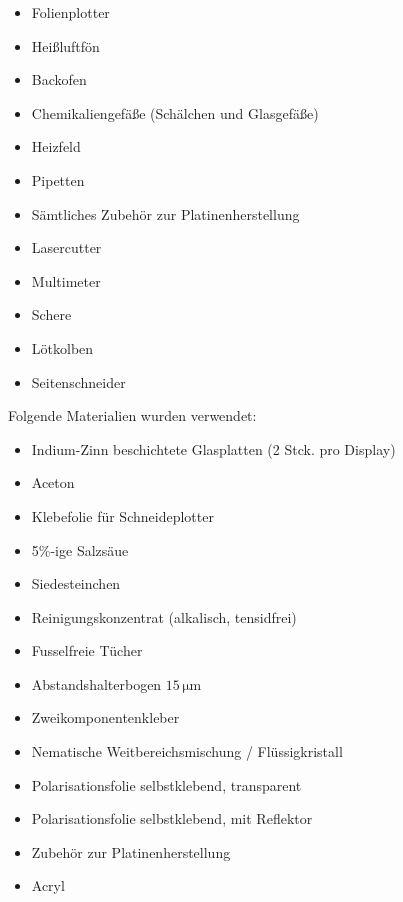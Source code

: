 \begin{itemize}
\item Folienplotter
\item Heißluftfön
\item Backofen
\item Chemikaliengefäße (Schälchen und Glasgefäße)
\item Heizfeld
\item Pipetten
\item Sämtliches Zubehör zur Platinenherstellung
\item Lasercutter
\item Multimeter
\item Schere
\item Lötkolben
\item Seitenschneider\\
\end{itemize}



Folgende Materialien wurden verwendet:\\

\begin{itemize}
\item Indium-Zinn beschichtete Glasplatten (2 Stck. pro Display)
\item Aceton
\item Klebefolie für Schneideplotter
\item 5\%-ige Salzsäue
\item Siedesteinchen
\item Reinigungskonzentrat (alkalisch, tensidfrei)
\item Fusselfreie Tücher
\item Abstandshalterbogen \(15\,\mathrm{\mu m}\)
\item Zweikomponentenkleber
\item Nematische Weitbereichsmischung / Flüssigkristall
\item Polarisationsfolie selbstklebend, transparent
\item Polarisationsfolie selbstklebend, mit Reflektor
\item Zubehör zur Platinenherstellung
\item Acryl
\end{itemize}